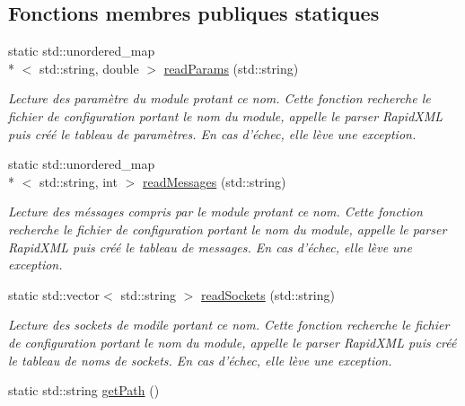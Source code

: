 \subsection*{Fonctions membres publiques statiques}
\begin{DoxyCompactItemize}
\item 
static std\-::unordered\-\_\-map\\*
$<$ std\-::string, double $>$ \hyperlink{classXMLReader_a176f21253bd7ac73c00c0aa46e2e5724}{read\-Params} (std\-::string)
\begin{DoxyCompactList}\small\item\em Lecture des paramètre du module protant ce nom. Cette fonction recherche le fichier de configuration portant le nom du module, appelle le parser Rapid\-X\-M\-L puis créé le tableau de paramètres. En cas d'échec, elle lève une exception. \end{DoxyCompactList}\item 
\hypertarget{classXMLReader_aa21f5dcd9d009e635c6acad97beb240a}{static std\-::unordered\-\_\-map\\*
$<$ std\-::string, int $>$ \hyperlink{classXMLReader_aa21f5dcd9d009e635c6acad97beb240a}{read\-Messages} (std\-::string)}\label{classXMLReader_aa21f5dcd9d009e635c6acad97beb240a}

\begin{DoxyCompactList}\small\item\em Lecture des méssages compris par le module protant ce nom. Cette fonction recherche le fichier de configuration portant le nom du module, appelle le parser Rapid\-X\-M\-L puis créé le tableau de messages. En cas d'échec, elle lève une exception. \end{DoxyCompactList}\item 
\hypertarget{classXMLReader_af23225be3e3a4db017f1e22d1b21f7eb}{static std\-::vector$<$ std\-::string $>$ \hyperlink{classXMLReader_af23225be3e3a4db017f1e22d1b21f7eb}{read\-Sockets} (std\-::string)}\label{classXMLReader_af23225be3e3a4db017f1e22d1b21f7eb}

\begin{DoxyCompactList}\small\item\em Lecture des sockets de modile portant ce nom. Cette fonction recherche le fichier de configuration portant le nom du module, appelle le parser Rapid\-X\-M\-L puis créé le tableau de noms de sockets. En cas d'échec, elle lève une exception. \end{DoxyCompactList}\item 
\hypertarget{classXMLReader_a5147abbb0cacd3fbcc396a23cc63456b}{static std\-::string \hyperlink{classXMLReader_a5147abbb0cacd3fbcc396a23cc63456b}{get\-Path} ()}\label{classXMLReader_a5147abbb0cacd3fbcc396a23cc63456b}


\end{DoxyCompactItemize}
